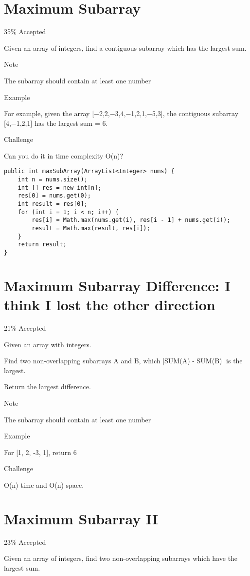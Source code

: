 \documentclass[12pt]{book}
\begin{document}
\chapter{Maximum Subarray}
\label{sec-37}

35\% Accepted

Given an array of integers, find a contiguous subarray which has the largest sum.

Note

The subarray should contain at least one number

Example

For example, given the array [−2,2,−3,4,−1,2,1,−5,3], the contiguous subarray [4,−1,2,1] has the largest sum = 6.

Challenge

Can you do it in time complexity O(n)?
\lstset{language=java,label= ,caption= ,numbers=none}
\begin{lstlisting}
public int maxSubArray(ArrayList<Integer> nums) {
    int n = nums.size();
    int [] res = new int[n];
    res[0] = nums.get(0);
    int result = res[0];
    for (int i = 1; i < n; i++) {
        res[i] = Math.max(nums.get(i), res[i - 1] + nums.get(i));
        result = Math.max(result, res[i]);
    }
    return result;
}
\end{lstlisting}
\chapter{Maximum Subarray Difference: I think I lost the other direction}
\label{sec-38}

21\% Accepted

Given an array with integers.

Find two non-overlapping subarrays A and B, which |SUM(A) - SUM(B)| is the largest.

Return the largest difference.

Note

The subarray should contain at least one number

Example

For [1, 2, -3, 1], return 6

Challenge

O(n) time and O(n) space.
\chapter{Maximum Subarray II}
\label{sec-39}

23\% Accepted

Given an array of integers, find two non-overlapping subarrays which have the largest sum.
\end{document}
